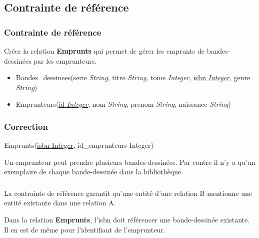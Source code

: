 \documentclass[svgnames,11pt]{beamer}
\begin{document}
\subsection{Contrainte de référence}
\begin{frame}
    \frametitle{Contrainte de référence}

    \begin{activite}
    Créer la relation \textbf{Emprunts} qui permet de gérer les emprunts de bandes-dessinées par les emprunteurs.
    \begin{itemize}
        \item Bandes\_dessinees(serie \emph{String}, titre \emph{String}, tome \emph{Integer}, \underline{isbn \emph{Integer}}, genre \emph{String})
        \item Emprunteurs(\underline{id \emph{Integer}}, nom \emph{String}, prenom \emph{String}, naissance \emph{String})
    \end{itemize}
    \end{activite}

\end{frame}
\begin{frame}
    \frametitle{Correction}

    \begin{center}
        Emprunts(\underline{isbn Integer}, id\_emprunteurs Integer)
    \end{center}

    \begin{aretenir}[Remarque]
    Un emprunteur peut prendre plusieurs bandes-dessinées. Par contre il n'y a qu'un exemplaire de chaque bande-dessinée dans la bibliothèque.
    \end{aretenir}
\end{frame}
\begin{frame}
    \frametitle{}

    \begin{aretenir}[]
        La contrainte de référence garantit qu'une entité d'une relation B mentionne une entité existante dans une relation A.
    \end{aretenir}

    Dans la relation \textbf{Emprunts}, l'isbn doit référencer une bande-dessinée existante. Il en est de même pour l'identifiant de l'emprunteur.
\end{frame}
\end{document}
